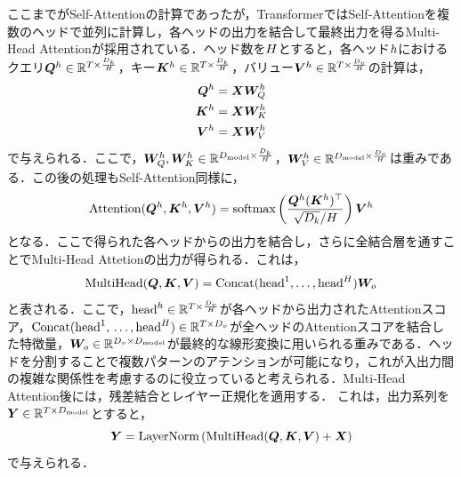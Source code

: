 \documentclass[12pt]{jarticle}
\numberwithin{equation}{section}    %
\numberwithin{figure}{section}      %
\numberwithin{table}{section}      %
\begin{document}
ここまでがSelf-Attentionの計算であったが，TransformerではSelf-Attentionを複数のヘッドで並列に計算し，各ヘッドの出力を結合して最終出力を得るMulti-Head Attentionが採用されている．ヘッド数を$H$とすると，各ヘッド$h$におけるクエリ$\bm{Q}^{h} \in \mathbb{R}^{T \times \frac{D_{k}}{H}}$，キー$\bm{K}^{h} \in \mathbb{R}^{T \times \frac{D_{k}}{H}}$，バリュー$\bm{V}^{h} \in \mathbb{R}^{T \times \frac{D_{v}}{H}}$の計算は，
\begin{align}
    \bm{Q}^{h} & = \bm{X}\bm{W}_{Q}^{h} \\
    \bm{K}^{h} & = \bm{X}\bm{W}_{K}^{h} \\
    \bm{V}^{h} & = \bm{X}\bm{W}_{V}^{h}
\end{align}
で与えられる．ここで，$\bm{W}_{Q}^{h}, \bm{W}_{K}^{h} \in \mathbb{R}^{D_{\text{model}} \times \frac{D_{k}}{H}}$，$\bm{W}_{V}^{h} \in \mathbb{R}^{D_{\text{model}} \times \frac{D_{v}}{H}}$は重みである．この後の処理もSelf-Attention同様に，
\begin{equation}
    \text{Attention}(\bm{Q}^{h}, \bm{K}^{h}, \bm{V}^{h}) = \text{softmax}\left(\frac{\bm{Q}^{h}(\bm{K}^{h})^\top}{\sqrt{D_{k}} / H}\right) \bm{V}^{h}
\end{equation}
となる．ここで得られた各ヘッドからの出力を結合し，さらに全結合層を通すことでMulti-Head Attetionの出力が得られる．これは，
\begin{equation}
    \text{MultiHead}(\bm{Q}, \bm{K}, \bm{V}) = \text{Concat}(\text{head}^{1}, \ldots, \text{head}^{H})\bm{W}_{o}
\end{equation}
と表される．ここで，$\text{head}^{h} \in \mathbb{R}^{T \times \frac{D_{v}}{H}}$が各ヘッドから出力されたAttentionスコア，$\text{Concat}(\text{head}^{1}, \\ \ldots, \text{head}^{H}) \in \mathbb{R}^{T \times D_{v}}$が全ヘッドのAttentionスコアを結合した特徴量，$\bm{W}_{o} \in \mathbb{R}^{D_{v} \times D_{\text{model}}}$が最終的な線形変換に用いられる重みである．ヘッドを分割することで複数パターンのアテンションが可能になり，これが入出力間の複雑な関係性を考慮するのに役立っていると考えられる．Multi-Head Attention後には，残差結合とレイヤー正規化を適用する．
これは，出力系列を$\bm{Y} \in \mathbb{R}^{T \times D_{\text{model}}}$とすると，
\begin{equation}
    \bm{Y} = \text{LayerNorm}\left(\text{MultiHead}(\bm{Q}, \bm{K}, \bm{V}) + \bm{X}\right)
\end{equation}
で与えられる．
\end{document}
